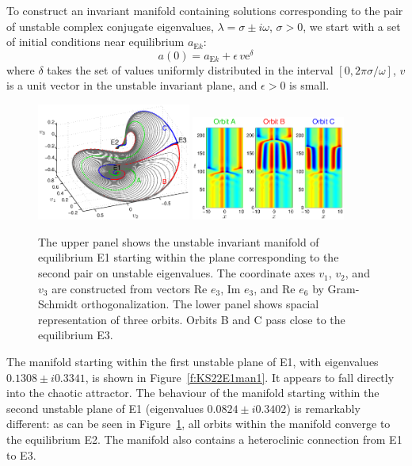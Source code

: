 To construct an invariant manifold containing solutions
corresponding to the pair of unstable complex conjugate eigenvalues,
$\lambda = \sigma\pm i\omega$, $\sigma > 0$, we start with a set of
initial conditions near equilibrium $a_{\mathrm{E}k}$:
\[ a(0) = a_{\mathrm{E}k} + \epsilon\,v\mathrm{e}^{\delta}\]
where $\delta$ takes the set of values uniformly distributed in the
interval $[0,2\pi\sigma/\omega]$, $v$ is a unit vector in the
unstable invariant plane, and $\epsilon > 0$ is small.

\begin{figure}[h]\vspace*{-5pt} \centering
\includegraphics[width=0.45\textwidth]{figs/ks22_E1_plane2_manifold.eps}
\includegraphics[width=0.45\textwidth]{figs/ks22_E1_plane2_orbits.eps}
\vspace*{-5pt}\caption{ {\small The upper panel shows the unstable
invariant manifold of equilibrium E1 starting within the plane
corresponding to the second pair on unstable eigenvalues. The
coordinate axes $v_1$, $v_2$, and $v_3$ are constructed from vectors
Re $e_3$, Im $e_3$, and Re $e_6$ by Gram-Schmidt orthogonalization.
The lower panel shows spacial representation of three orbits. Orbits
B and C pass close to the equilibrium E3.}}
\label{f:KS22E1man2}\vspace*{-5pt}
\end{figure}

The manifold starting within the first unstable plane of E1, with
eigenvalues $0.1308\pm i0.3341$, is shown in
Figure~\ref{f:KS22E1man1}. It appears to fall directly into the
chaotic attractor.  The behaviour of the manifold starting within
the second unstable plane of E1 (eigenvalues $0.0824\pm i0.3402$) is
remarkably different: as can be seen in Figure~\ref{f:KS22E1man2},
all orbits within the manifold converge to the equilibrium E2.  The
manifold also contains a heteroclinic connection from E1 to E3.

